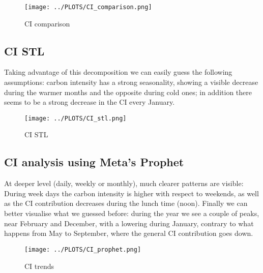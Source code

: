 \begin{figure}[H]
\centering
\texttt{[image: ../PLOTS/CI\_comparison.png]}
\captionsetup{skip=-10pt}
\caption{CI comparison}
\label{CI_comparison}
\end{figure}

\subsection{CI STL}
Taking advantage of this decomposition we can easily guess the following assumptions: carbon intensity has a strong seasonality, showing a visible decrease during the warmer months and the opposite during cold ones; in addition there seems to be a strong decrease in the CI every January.

\vspace{-15pt}

\begin{figure}[H]
\centering
\texttt{[image: ../PLOTS/CI\_stl.png]}
\captionsetup{skip=-10pt}
\caption{CI STL}
\label{CI_stl}
\end{figure}

\subsection{CI analysis using Meta's Prophet}
At deeper level (daily, weekly or monthly), much clearer patterns are visible: \\
During week days the carbon intensity is higher with respect to weekends, as well as the CI contribution decreases during the lunch time (noon). Finally we can better visualise what we guessed before: during the year we see a couple of peaks, near February and December, with a lowering during January, contrary to what happens from May to September, where the general CI contribution goes down.

\vspace{-15pt}

\begin{figure}[H]
\centering
\texttt{[image: ../PLOTS/CI\_prophet.png]}
\captionsetup{skip=-10pt}
\caption{CI trends}
\label{CI_prophet}
\end{figure}